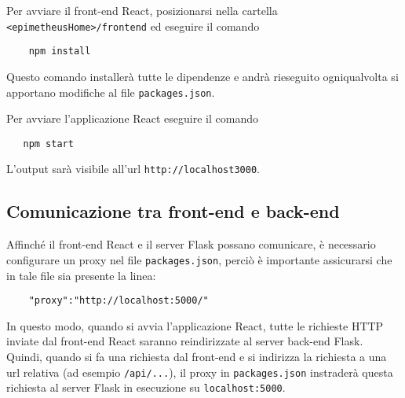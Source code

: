 Per avviare il front-end React, posizionarsi nella cartella \verb|<epimetheusHome>/frontend| ed eseguire il comando
\begin{verbatim}
    npm install
\end{verbatim}
Questo comando installerà tutte le dipendenze e andrà rieseguito ogniqualvolta si apportano modifiche al file \verb|packages.json|.

Per avviare l’applicazione React eseguire il comando
\begin{verbatim}
   npm start 
\end{verbatim}
L’output sarà visibile all'url \verb|http://localhost3000|.

\subsection*{Comunicazione tra front-end e back-end}
Affinché il front-end React e il server Flask possano comunicare, è necessario configurare un proxy nel file \verb|packages.json|, perciò è importante assicurarsi che in tale file sia presente la linea:
\begin{verbatim}
    "proxy":"http://localhost:5000/"
\end{verbatim}
In questo modo, quando si avvia l'applicazione React, tutte le richieste HTTP inviate dal front-end React saranno reindirizzate al server back-end Flask. Quindi, quando si fa una richiesta dal  front-end  e si indirizza la richiesta a una url relativa (ad esempio \verb|/api/...|), il proxy in \verb|packages.json| instraderà questa richiesta al server Flask in esecuzione su \verb|localhost:5000|.

